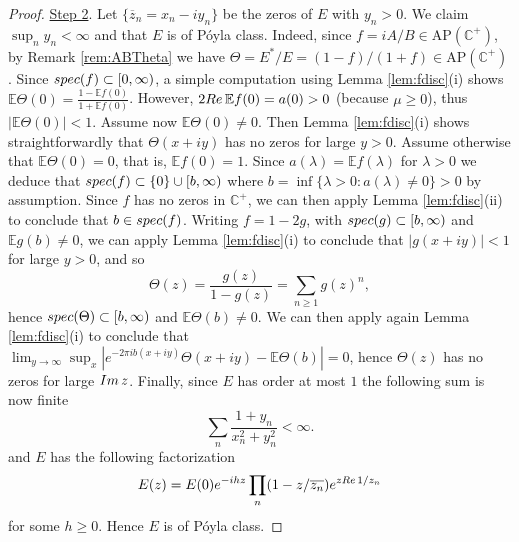 \documentclass[a4paper,reqno,12pt]{amsart}
\newcommand{\E}{\mathcal{E}}
\renewcommand{\H}{\mathbb{C}^+}
\newcommand{\im}{{\rm Im}\,}
\newcommand{\re}{{\rm Re}\,}
\newcommand{\la}{\lambda}
\newcommand{\1}{{\bf 1}}
\newcommand{\apc}{\mathrm{AP}(\H)}
\renewcommand{\E}{\mathbb{E}}
\newcommand{\ov}[1]{\overline{#1}}
\renewcommand{\1}{{\bo 1}}
\newcommand{\spec}{{\rm spec}}
\begin{document}
\begin{proof}
\underline{Step 2}. Let $\{\ov z_n=x_n-iy_n\}$ be the zeros of $E$ with $y_n> 0$. We claim $\sup_{n} y_n <\infty$ and that $E$ is of P\'oyla class. Indeed, since $f=iA/B\in \apc$, by Remark \ref{rem:ABTheta} we have $\Theta=E^*/E=(1-f)/(1+f) \in \apc$. Since $\spec(f)\subset [0,\infty)$, a simple computation using Lemma \ref{lem:fdisc}(i) shows
$\E \Theta(0)=\frac{1-\E f(0)}{1+\E f(0)}$. However, $2\re \E f(0) = a(0)>0$ (because $\mu\geq 0$), thus $|\E \Theta(0)|<1$. Assume now $\E \Theta(0)\neq 0$. Then Lemma \ref{lem:fdisc}(i) shows straightforwardly that $\Theta(x+iy)$ has no zeros for large $y>0$. Assume otherwise that $\E \Theta(0)=0$, that is, $\E f(0)=1$. Since $a(\la)=\E f(\la)$ for $\la>0$ we deduce that $\spec(f) \subset \{0\}\cup [b,\infty)$ where $b=\inf\{\la>0 : a(\la)\neq 0\}>0$ by assumption. Since  $f$ has no zeros in $\H$, we can then apply Lemma \ref{lem:fdisc}(ii) to conclude that $b\in \spec(f)$. Writing $f=1-2g$, with $\spec(g)\subset [b,\infty)$ and $\E g(b)\neq 0$, we can apply Lemma \ref{lem:fdisc}(i) to conclude that $|g(x+iy)|<1$ for large $y>0$, and so
$$
\Theta(z) = \frac{g(z)}{1-g(z)} =  \sum_{n\geq 1} g(z)^{n},
$$
hence $\spec(\Theta)\subset [b,\infty)$ and $\E \Theta(b)\neq 0$. We can then apply again Lemma \ref{lem:fdisc}(i) to conclude that $\lim_{y\to\infty}\sup_{x}|e^{-2\pi i b (x+iy)}\Theta(x+iy)- \E \Theta(b)|=0$, hence $\Theta(z)$ has no zeros for large $\im z$. Finally, since $E$ has order at most $1$ the following sum is now finite
$$
\sum_{n} \frac{1+y_n}{x_n^2+y_n^2}<\infty.
$$ 
and $E$ has the following factorization
 $$
E(z) = E(0)e^{-ihz} \prod_{n} (1-z/\ov{z_n})e^{z\re 1/z_n}
$$
for some $h\geq 0$. Hence $E$ is of P\'oyla class.


\end{proof}
\end{document}
